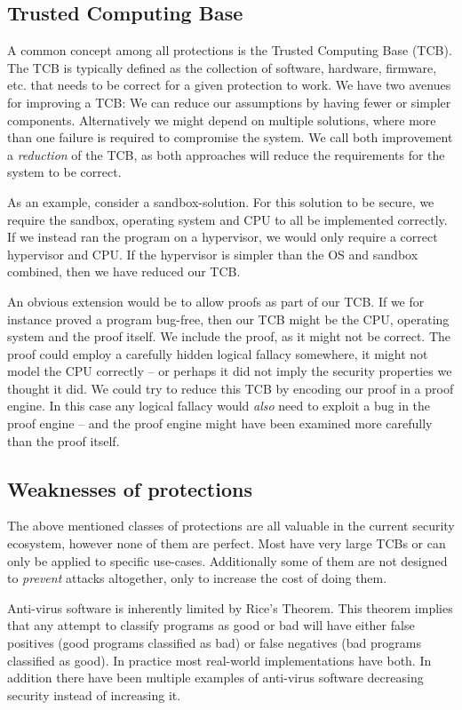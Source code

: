 \subsection{Trusted Computing Base}
A common concept among all protections is the Trusted Computing Base
  (TCB). The TCB is typically defined as the collection of software, hardware,
firmware, etc. that needs to be correct for a given protection to work. We have
two avenues for improving a TCB: We can reduce our assumptions by having fewer
or simpler components. Alternatively we might depend on multiple solutions,
where more than one failure is required to compromise the system. We call both
improvement a \emph{reduction} of the TCB, as both approaches will reduce the
requirements for the system to be correct.

As an example, consider a sandbox-solution. For this solution to be secure, we
require the sandbox, operating system and CPU to all be implemented
correctly. If we instead ran the program on a hypervisor, we would only require
a correct hypervisor and CPU. If the hypervisor is simpler than the OS and
sandbox combined, then we have reduced our TCB.

An obvious extension would be to allow proofs as part of our TCB. If we for
instance proved a program bug-free, then our TCB might be the CPU, operating
system and the proof itself. We include the proof, as it might not be
correct. The proof could employ a carefully hidden logical fallacy somewhere, it
might not model the CPU correctly -- or perhaps it did not imply the security
properties we thought it did. We could try to reduce this TCB by encoding our
proof in a proof engine. In this case any logical fallacy would \emph{also} need
to exploit a bug in the proof engine -- and the proof engine might have been
examined more carefully than the proof itself.

\subsection{Weaknesses of protections}
The above mentioned classes of protections are all valuable in the current
security ecosystem, however none of them are perfect. Most have very large TCBs
or can only be applied to specific use-cases. Additionally some of them are not
designed to \emph{prevent} attacks altogether, only to increase the cost of
doing them.

Anti-virus software is inherently limited by Rice's Theorem. This theorem implies that any attempt to classify
programs as good or bad will have either false positives (good programs
classified as bad) or false negatives (bad programs classified as good). In
practice most real-world implementations have both. In addition there have been
multiple examples of anti-virus software decreasing security instead of
increasing it.

